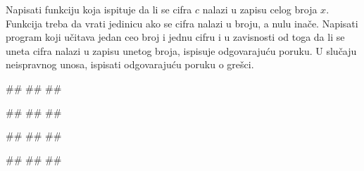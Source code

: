 \begin{Exercise}[label=FUN_11] 
Napisati funkciju  koja ispituje da li
se cifra $c$ nalazi u zapisu celog broja $x$. Funkcija treba da vrati
jedinicu ako se cifra nalazi u broju, a nulu inače. Napisati program koji
učitava jedan ceo broj i jednu cifru i u zavisnosti od toga da li se 
uneta cifra nalazi u zapisu unetog broja, ispisuje odgovarajuću poruku.
U slučaju neispravnog unosa, ispisati odgovarajuću poruku o grešci.

\begin{miditest}
\begin{upotreba}{1}
#\naslovInt#
##
##
\end{upotreba}
\end{miditest}
\begin{miditest}
\begin{upotreba}{2}
#\naslovInt#
##
##
\end{upotreba}
\end{miditest}

\begin{miditest}
\begin{upotreba}{3}
#\naslovInt#
##
##
\end{upotreba}
\end{miditest}
\begin{miditest}
\begin{upotreba}{4}
#\naslovInt#
##
##
\end{upotreba}
\end{miditest}

\end{Exercise}
\ifresenja 
\begin{Answer}[ref=FUN_11]
\end{Answer} 
\fi


